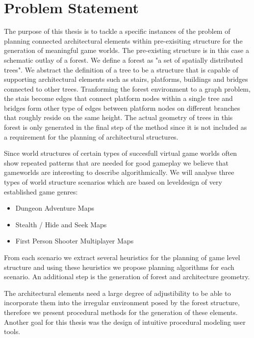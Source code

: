 \chapter{Problem Statement}
\label{sec:problem}


The purpose of this thesis is to tackle a specific instances of the problem of planning connected architectural elements within pre-exisiting structure for the generation of meaningful game worlds. The pre-existing structure is in this case a schematic outlay of a forest. We define a forest as "a set of spatially distributed trees". We abstract the definition of a tree to be a structure that is capable of supporting architectural elements such as stairs, platforms, buildings and bridges connected to other trees. 
Tranforming the forest environment to a graph problem, the stais become edges that connect platform nodes within a single tree and bridges form other type of edges between platform nodes on different branches that roughly reside on the same height. The actual geometry of trees in this forest is only generated in the final step of the method since it is not included as a requirement for the planning of architectural structures. 

Since world structures of certain types of succesfull virtual game worlds often show repeated patterns that are needed for good gameplay we believe that gameworlds are interesting to describe algorithmically. We will analyse three types of world structure scenarios which are based on leveldesign of very established game genres: 

\begin{itemize}
\item Dungeon Adventure Maps 
\item Stealth / Hide and Seek Maps 
\item First Person Shooter Multiplayer Maps 
\end{itemize} 

From each scenario we extract several heuristics for the planning of game level structure and using these heuristics we propose planning algorithms for each scenario. An additional step is the generation of forest and architecture geometry.  

The architectural elements need a large degree of adjustibility to be able to incorporate them into the irregular environment posed by the forest structure, therefore we present procedural methods for the generation of these elements. Another goal for this thesis was the design of intuitive procedural modeling user tools.      


